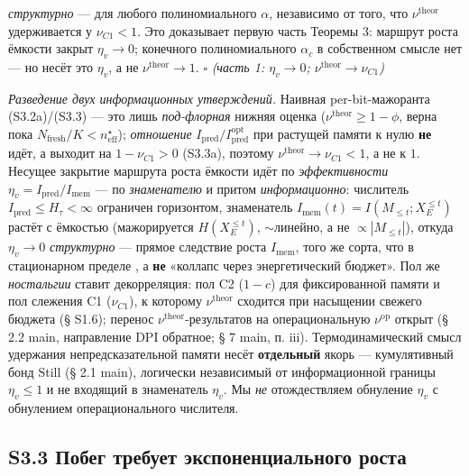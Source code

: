 \documentclass[12pt]{iopart}
\begin{document}
\emph{структурно} --- для любого полиномиального \(\alpha\), независимо от того, что \(\nu^{\text{theor}}\) удерживается у \(\nu_{C1} < 1\). Это доказывает первую часть Теоремы 3: маршрут роста ёмкости закрыт \(\eta_v \to 0\); конечного полиномиального \(\alpha_c\) в собственном смысле нет --- но несёт это \(\eta_v\), а не \(\nu^{\text{theor}} \to 1\). \(\square\) \emph{(часть 1: \(\eta_v \to 0\); \(\nu^{\text{theor}} \to \nu_{C1}\))}



\emph{Разведение двух информационных утверждений.} Наивная per-bit-мажоранта (S3.2a)/(S3.3) --- это лишь \emph{под-флорная} нижняя оценка (\(\nu^{\text{theor}} \ge 1-\phi\), верна пока \(N_{\text{fresh}}/K < n_{\text{eff}}^\star\)); \emph{отношение} \(I_{\text{pred}}/I_{\text{pred}}^{\text{opt}}\) при растущей памяти к нулю \textbf{не} идёт, а выходит на \(1-\nu_{C1} > 0\) (S3.3a), поэтому \(\nu^{\text{theor}} \to \nu_{C1} < 1\), а не к \(1\). Несущее закрытие маршрута роста ёмкости идёт по \emph{эффективности} \(\eta_v = I_{\text{pred}}/I_{\text{mem}}\) --- по \emph{знаменателю} и притом \emph{информационно}: числитель \(I_{\text{pred}} \le H_\tau < \infty\) ограничен горизонтом, знаменатель \(I_{\text{mem}}(t) = I(M_{\le t}; X_E^{\le t})\) растёт с ёмкостью (мажорируется \(H(X_E^{\le t})\), \(\sim\)линейно, а не \(\propto |M_{\le t}|\)), откуда \(\eta_v \to 0\) \emph{структурно} --- прямое следствие роста \(I_{\text{mem}}\), того же сорта, что в стационарном пределе \cite{Andriishin2026b}, а \textbf{не} «коллапс через энергетический бюджет». Пол же \emph{ностальгии} ставит декорреляция: пол C2 (\(1-c\)) для фиксированной памяти и пол слежения C1 (\(\nu_{C1}\)), к которому \(\nu^{\text{theor}}\) сходится при насыщении свежего бюджета (§ S1.6); перенос \(\nu^{\text{theor}}\)-результатов на операциональную \(\nu^{\text{op}}\) открыт (§ 2.2 main, направление DPI обратное; § 7 main, п. iii). Термодинамический смысл удержания непредсказательной памяти несёт \textbf{отдельный} якорь --- кумулятивный бонд Still (§ 2.1 main), логически независимый от информационной границы \(\eta_v \le 1\) и не входящий в знаменатель \(\eta_v\). Мы \emph{не} отождествляем обнуление \(\eta_v\) с обнулением операционального числителя.



\subsection{S3.3 Побег требует экспоненциального роста}\label{s3.3-ux43fux43eux431ux435ux433-ux442ux440ux435ux431ux443ux435ux442-ux44dux43aux441ux43fux43eux43dux435ux43dux446ux438ux430ux43bux44cux43dux43eux433ux43e-ux440ux43eux441ux442ux430}
\end{document}
